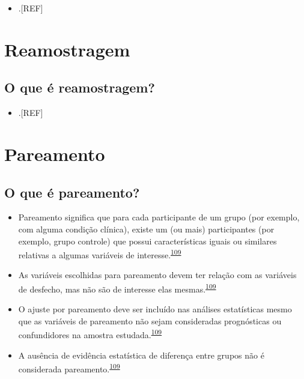 \documentclass[
]{book}
\providecommand{\tightlist}{%
  \setlength{\itemsep}{0pt}\setlength{\parskip}{0pt}}
\begin{document}
\begin{itemize}
\tightlist
\item
  .{[}REF{]}
\end{itemize}

\hypertarget{reamostragem}{%
\section{Reamostragem}\label{reamostragem}}

\hypertarget{o-que-uxe9-reamostragem}{%
\subsection{O que é reamostragem?}\label{o-que-uxe9-reamostragem}}

\begin{itemize}
\tightlist
\item
  .{[}REF{]}
\end{itemize}

\hypertarget{pareamento}{%
\section{Pareamento}\label{pareamento}}

\hypertarget{o-que-uxe9-pareamento}{%
\subsection{O que é pareamento?}\label{o-que-uxe9-pareamento}}

\begin{itemize}
\item
  Pareamento significa que para cada participante de um grupo (por exemplo, com alguma condição clínica), existe um (ou mais) participantes (por exemplo, grupo controle) que possui características iguais ou similares relativas a algumas variáveis de interesse.\textsuperscript{\protect\hyperlink{ref-Bland1994}{109}}
\item
  As variáveis escolhidas para pareamento devem ter relação com as variáveis de desfecho, mas não são de interesse elas mesmas.\textsuperscript{\protect\hyperlink{ref-Bland1994}{109}}
\item
  O ajuste por pareamento deve ser incluído nas análises estatísticas mesmo que as variáveis de pareamento não sejam consideradas prognósticas ou confundidores na amostra estudada.\textsuperscript{\protect\hyperlink{ref-Bland1994}{109}}
\item
  A ausência de evidência estatística de diferença entre grupos não é considerada pareamento.\textsuperscript{\protect\hyperlink{ref-Bland1994}{109}}
\end{itemize}
\end{document}

